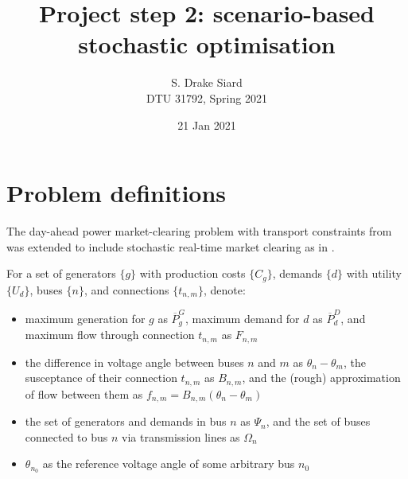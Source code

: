 \documentclass[11pt,a4paper]{article}
\title{\textbf{Project step 2: scenario-based stochastic optimisation}}
\author{S. Drake Siard\\
DTU 31792, Spring 2021}
\date{21 Jan 2021}
\numberwithin{equation}{section}
\begin{document}
\newcommand{\pd}{\ensuremath{p^D_d}}
\newcommand{\ud}{\ensuremath{U_d}}
\newcommand{\pg}{\ensuremath{p^G_g}}
\newcommand{\cg}{\ensuremath{C_g}}
\newcommand{\bnm}{\ensuremath{B_{n,m}}}
\newcommand{\tnm}{\ensuremath{t_{n,m}}}
\newcommand{\fnm}{\ensuremath{f_{n,m}}}
\newcommand{\FNM}{\ensuremath{F_{n,m}}}
\newcommand{\PG}{\ensuremath{\overline{P}^G_g}}
\newcommand{\PD}{\ensuremath{\overline{P}^D_d}}

\newcommand{\mudup}{\ensuremath{\overline{\mu}_d^D}}
\newcommand{\muddown}{\ensuremath{\underline{\mu}_d^D}}
\newcommand{\mugup}{\ensuremath{\overline{\mu}_g^G}}
\newcommand{\mugdown}{\ensuremath{\underline{\mu}_g^G}}
\newcommand{\etaup}{\ensuremath{\overline{\eta}_{n,m}}}
\newcommand{\etadown}{\ensuremath{\underline{\eta}_{n,m}}}
\newcommand{\etaupm}{\ensuremath{\overline{\eta}_{m,n}}}
\newcommand{\etadownm}{\ensuremath{\underline{\eta}_{m,n}}}

\maketitle

\section{Problem definitions}

The day-ahead power market-clearing problem with transport constraints from \cite{kazempourLectureMarketClearing2021} was extended to include stochastic real-time market clearing as in \cite{kazempourLectureStochasticMarket2021}.



For a set of generators $\{g\}$ with production costs $\{\cg\}$, demands $\{d\}$ with utility $\{\ud\}$, buses $\{n\}$, and connections $\{\tnm\}$, denote:
 \begin{itemize}
\item maximum generation for $g$ as $\PG$, maximum demand for $d$ as $\PD$, and maximum flow through connection $\tnm$ as $\FNM$
\item the difference in voltage angle between buses $n$ and $m$ as $\theta_n - \theta_m$, the susceptance of their connection $\tnm$ as $\bnm$, and the (rough) approximation of flow between them as $\fnm = \bnm(\theta_n - \theta_m)$
\item the set of generators and demands in bus $n$ as $\Psi_n$, and the set of buses connected to bus $n$ via transmission lines as $\Omega_n$
\item $\theta_{n_0}$ as the reference voltage angle of some arbitrary bus $n_0$
\end{itemize}
\end{document}
